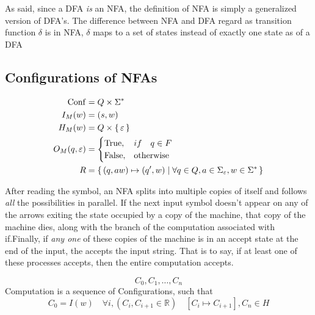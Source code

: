 As said, since a DFA \emph{is} an NFA, the definition of NFA is simply a generalized
version of DFA's. The difference between NFA and DFA regard as  transition function
$\delta$ is in NFA, $\delta$ maps to a set of states instead of exactly one state as of a
DFA

\subsection{Configurations of NFAs}

\begin{definition}
    \begin{align*}
        { \mathrm{Conf} }  &= Q \times \Sigma^* \\
        I_M(w) &= (s,w)             \\
        H_M(w) &= Q \times { \left\{\,\varepsilon\,\right\} } \\
        O_M(q,\varepsilon)
              &= \begin{cases}
              { \text{\upshape True} },  & if \quad q \in F \\
              { \text{\upshape False} }, & \text{otherwise}
              \end{cases}
              \\
              R &= { \left\{\,(q,aw) \mapsto (q',w) \mid
                 \forall q \in Q, a \in \Sigma_{\varepsilon}, w \in \Sigma^*\,\right\} }
                 \end{align*}
\end{definition}

After reading the symbol, an NFA splits into multiple copies of itself and follows
\emph{all} the possibilities in parallel. If the next input symbol doesn't appear on any
of the arrows exiting the state occupied by a copy of the machine, that copy of the
machine dies, along with the branch of the computation associated with if.Finally, if 
\emph{any one} of these copies of the machine is in an accept state at the end of the
input, the  accepts the input string. That is to say, if at least one of
these processes accepts, then the entire computation accepts.

\begin{definition}[Computation]
    \label{def:computation}
    \[
    C_0, C_1, \dots , C_n
    \]
    Computation is a sequence of Configurations, such that 
    \[
    C_0 = I(w) \quad 
    \forall i, (C_i, C_{i+1} \in \mathbb{R}) \quad
    [C_i \mapsto C_{i+1}], C_n \in H  
    \]
\end{definition}

